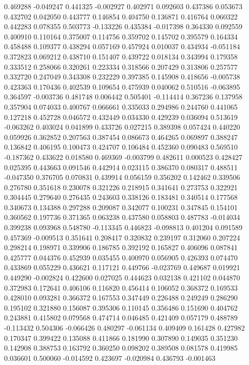 0.469288
-0.049247
0.441325
-0.002927
0.402971
0.092603
0.437386
0.053673
0.432702
0.042050
0.443777
0.146854
0.404750
0.136871
0.416764
0.060322
0.442283
0.078355
0.503773
-0.133226
0.435384
-0.017398
0.364330
0.092559
0.400910
0.110164
0.375007
0.114756
0.359702
0.145702
0.395579
0.164334
0.458488
0.109377
0.438294
0.057169
0.457924
0.010037
0.434934
-0.051184
0.372823
0.069212
0.438710
0.151407
0.439722
0.018134
0.343994
0.179358
0.333512
0.258066
0.320261
0.223334
0.318566
0.207429
0.313806
0.257577
0.332720
0.247049
0.343308
0.232229
0.397385
0.145908
0.418656
-0.005738
0.423363
0.170436
0.402539
0.109654
0.475939
0.040062
0.510516
-0.063895
0.364597
-0.003736
0.481748
0.006442
0.505401
-0.114414
0.367236
0.137958
0.357904
0.074033
0.400767
0.066661
0.335033
0.294986
0.244760
0.441065
0.127218
0.452728
0.046572
0.432449
0.034330
0.429239
0.036094
0.513619
-0.063262
0.403024
0.041899
0.433726
0.027215
0.389398
0.057424
0.440220
0.059926
0.362852
0.207563
0.387454
0.086673
0.464265
0.069897
0.388247
0.136842
0.406195
0.100473
0.424707
0.106484
0.452360
0.090483
0.569510
-0.187362
0.433622
0.018580
0.469369
-0.003799
0.482611
0.000523
0.428427
0.025395
0.443663
0.091546
0.442914
0.023115
0.386370
0.080317
0.488511
-0.047350
0.376705
0.070831
0.439914
0.056159
0.356202
0.142462
0.339506
0.276780
0.351618
0.230078
0.321226
0.218915
0.341641
0.273753
0.322921
0.304445
0.279640
0.276435
0.243603
0.338126
0.183481
0.340514
0.177568
0.340673
0.134388
0.297288
0.209087
0.342077
0.100231
0.347845
0.154101
0.360562
0.197736
0.371365
0.063238
0.437580
0.058803
0.487783
-0.014034
0.399238
0.093968
0.548780
-0.113345
0.446823
-0.098813
0.401204
0.091589
0.457369
-0.009513
0.351641
0.208417
0.320832
0.239197
0.312060
0.207224
0.298214
0.198971
0.339906
0.186785
0.392192
0.165827
0.406096
0.087841
0.425777
0.044376
0.452939
0.035455
0.400970
0.056905
0.426393
0.074470
0.433869
0.055229
0.436621
0.117121
0.449766
-0.023769
0.449687
0.019921
0.449290
-0.002824
0.422600
0.027025
0.444623
0.032138
0.421102
0.044870
0.372983
0.172641
0.406106
0.116820
0.456414
0.106052
0.368372
0.169533
0.428010
0.093281
0.366372
0.167553
0.347449
0.226488
0.249249
0.286290
0.195102
0.321880
0.156087
0.395306
0.110145
0.356486
0.151690
0.404762
0.243881
0.415802
0.079568
0.474714
0.046485
0.421409
0.057179
0.488789
-0.113432
0.504306
-0.066426
0.480297
-0.061134
0.409409
0.161428
0.427982
0.170347
0.399422
0.135088
0.411866
0.181990
0.307890
0.149035
0.351230
0.142908
0.388753
0.163792
0.360250
0.098202
0.389508
0.081578
0.419985
0.036601
0.500060
-0.014592
0.423697
-0.020984
0.436793
-0.001463
